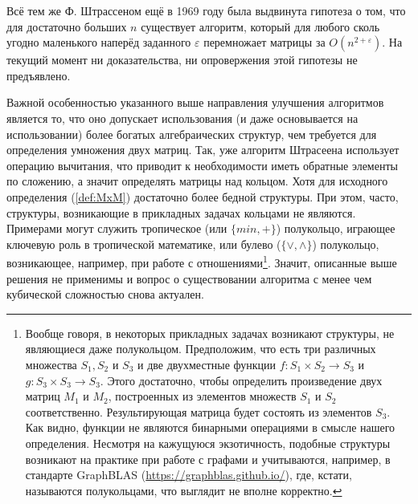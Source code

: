 Всё тем же Ф. Штрассеном ещё в 1969 году была выдвинута гипотеза о том, что для достаточно больших $n$ существует алгоритм, который для любого сколь угодно маленького наперёд заданного $\varepsilon$ перемножает матрицы за $O(n^{2+\varepsilon})$. На текущий момент ни доказательства, ни опровержения этой гипотезы не предъявлено.

Важной особенностью указанного выше направления улучшения алгоритмов является то, что оно допускает использования (и даже основывается на использовании) более богатых алгебраических структур, чем требуется для определения умножения двух матриц. Так, уже алгоритм Штрасеена использует операцию вычитания, что приводит к необходимости иметь обратные элементы по сложению, а значит определять матрицы над кольцом. Хотя для исходного определения (\ref{def:MxM}) достаточно более бедной структуры. При этом, часто, структуры, возникающие в прикладных задачах кольцами не являются. Примерами могут служить тропическое (или $\{min,+\}$) полукольцо, играющее ключевую роль в тропической математике, или булево ($\{\vee,\wedge\}$) полукольцо, возникающее, например, при работе с отношениями\footnote{Вообще говоря, в некоторых прикладных задачах возникают структуры, не являющиеся даже полукольцом. Предположим, что есть три различных множества $S_1, S_2$ и $S_3$ и две двухместные функции $f:S_1 \times S_2 \to S_3$ и $g: S_3 \times S_3 \to S_3$. Этого достаточно, чтобы определить произведение двух матриц $M_1$ и $M_2$, построенных из элементов множеств $S_1$ и $S_2$ соответственно. Результирующая матрица будет состоять из элементов $S_3$. Как видно, функции не являются бинарными операциями в смысле нашего определения. Несмотря на кажущуюся экзотичность, подобные структуры возникают на практике при работе с графами и учитываются, например, в стандарте GraphBLAS (\url{https://graphblas.github.io/}), где, кстати, называются полукольцами, что выглядит не вполне корректно.}. Значит, описанные выше решения не применимы и вопрос о существовании алгоритма с менее чем кубической сложностью снова актуален.

